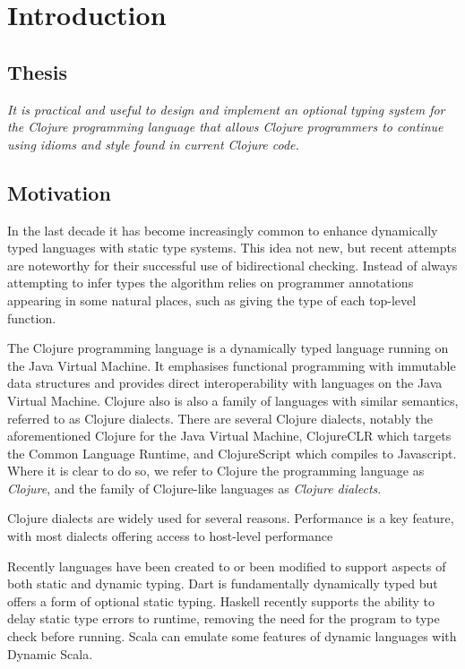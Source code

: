 \chapter{Introduction}

\section{Thesis}

\emph{It is practical and useful to design and implement an optional typing system 
for the Clojure programming language that allows Clojure programmers to continue 
using idioms and style found in current Clojure code.}

\section{Motivation}


In the last decade it has become increasingly common to enhance
dynamically typed languages with static type systems. This idea not new,
but recent attempts are noteworthy for their successful use of bidirectional checking.
Instead of always attempting to infer types the algorithm relies on programmer annotations
appearing in some natural places, such as giving the type of each top-level function.

The Clojure programming language is a dynamically typed language running on the Java Virtual Machine. 
It emphasises functional programming with immutable data structures
and provides direct interoperability with languages on the Java Virtual Machine.
Clojure also is also a family of languages with similar semantics, referred to as Clojure dialects.
There are several Clojure dialects, notably the aforementioned Clojure for the Java Virtual Machine,
ClojureCLR which targets the Common Language Runtime, and ClojureScript which compiles to Javascript.
Where it is clear to do so, we refer to Clojure the programming language as \emph{Clojure}, 
and the family of Clojure-like languages as \emph{Clojure dialects}.

Clojure dialects are widely used for several reasons.
Performance is a key feature, with most dialects 
offering access to host-level performance 

Recently languages have been created to or been modified to support aspects
of both static and dynamic typing.
Dart is fundamentally dynamically typed but offers a form of optional
static typing. Haskell recently supports the ability to delay static type errors 
to runtime, removing the need for the program to type check before running.
Scala can emulate some features of dynamic languages with Dynamic Scala.

